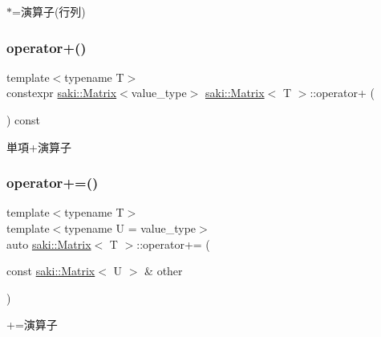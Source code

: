 $\ast$=演算子(行列) 

\mbox{\label{classsaki_1_1_matrix_a4ad581da47941ff512c0c6e26295930d}} 
\subsubsection{\texorpdfstring{operator+()}{operator+()}}
{\footnotesize\ttfamily template$<$typename T$>$ \\
constexpr \mbox{\hyperlink{classsaki_1_1_matrix}{saki\+::\+Matrix}}$<$value\+\_\+type$>$ \mbox{\hyperlink{classsaki_1_1_matrix}{saki\+::\+Matrix}}$<$ T $>$\+::operator+ (\begin{DoxyParamCaption}{ }\end{DoxyParamCaption}) const\hspace{0.3cm}{\ttfamily [inline]}}



単項+演算子 

\mbox{\label{classsaki_1_1_matrix_a5361db043630dee8f98de089c5df6ed1}} 
\subsubsection{\texorpdfstring{operator+=()}{operator+=()}}
{\footnotesize\ttfamily template$<$typename T$>$ \\
template$<$typename U  = value\+\_\+type$>$ \\
auto \mbox{\hyperlink{classsaki_1_1_matrix}{saki\+::\+Matrix}}$<$ T $>$\+::operator+= (\begin{DoxyParamCaption}\item[{const \mbox{\hyperlink{classsaki_1_1_matrix}{saki\+::\+Matrix}}$<$ U $>$ \&}]{other }\end{DoxyParamCaption})\hspace{0.3cm}{\ttfamily [inline]}}



+=演算子 

\mbox{\label{classsaki_1_1_matrix_a2c5f20009484a43c60cb80fc3db7447a}} 
